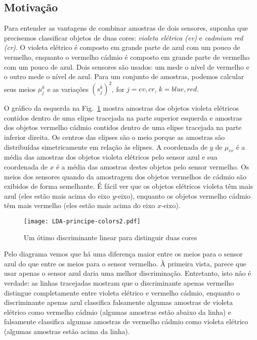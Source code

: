 \subsection{Motivação}

Para entender as vantagens de combinar amostras de dois sensores, suponha que precisemos classificar objetos de duas cores: \emph{violeta elétrica (ev)} e \emph{cadmium red (cr)}. O violeta elétrico é composto em grande parte de azul com um pouco de vermelho, enquanto o vermelho cádmio é composto em grande parte de vermelho com um pouco de azul. Dois sensores são usados: um mede o nível de vermelho e o outro mede o nível de azul. Para um conjunto de amostras, podemos calcular seus meios $\mu_j^k$ e as variações $(s_j^k)^2$, for $j=\mathit{ev}, \mathit{cr}$, $k=\mathit{blue}, \mathit{red}$.

O gráfico da esquerda na Fig.~\ref{fig.LDAprincipe} mostra amostras dos objetos violeta elétricos contidos dentro de uma elipse tracejada na parte superior esquerda e amostras dos objetos vermelho cádmio contidos dentro de uma elipse tracejada na parte inferior direita. Os centros das elipses são o meio porque as amostras são distribuídas simetricamente em relação às elipses. A coordenada de $y$ de $\mu_{ev}$ é a média das amostras dos objetos violeta elétricos pelo sensor azul e sua coordenada de $x$ é a média das amostras destes objetos pelo sensor vermelho. Os meios dos sensores quando da amostragem dos objetos vermelhos de cádmio são exibidos de forma semelhante. É fácil ver que os objetos elétricos violeta têm mais azul (eles estão mais acima do eixo $y$-eixo), enquanto os objetos vermelho cádmio têm mais vermelho (eles estão mais acima do eixo $x$-eixo).

\begin{figure}
\begin{center}
\texttt{[image: LDA-principe-colors2.pdf]}
\end{center}
\caption{Um ótimo discriminante linear para distinguir duas cores}\label{fig.LDAprincipe}
\end{figure}

Pelo diagrama vemos que há uma diferença maior entre os meios para o sensor azul do que entre os meios para o sensor vermelho. À primeira vista, parece que usar apenas o sensor azul daria uma melhor discriminação. Entretanto, isto não é verdade: as linhas tracejadas mostram que o discriminante apenas vermelho distingue completamente entre violeta elétrico e vermelho cádmio, enquanto o discriminante apenas azul classifica falsamente algumas amostras de violeta elétrico como vermelho cádmio (algumas amostras estão abaixo da linha) e falsamente classifica algumas amostras de vermelho cádmio como violeta elétrico (algumas amostras estão acima da linha).

